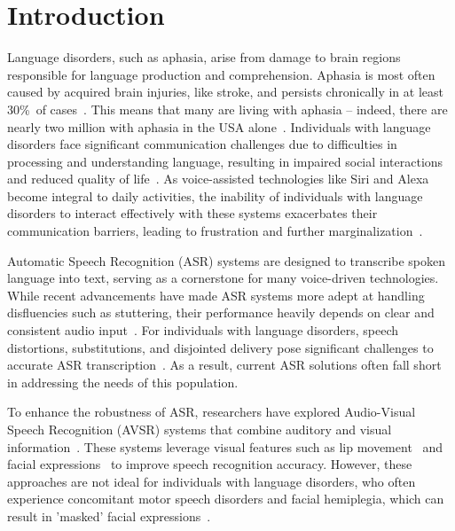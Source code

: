 \section{Introduction}

Language disorders, such as aphasia, arise from damage to brain regions responsible for language production and comprehension. Aphasia is most often caused by acquired brain injuries, like stroke, and persists chronically in at least 30\%\ of cases~\cite{broca1861remarks,wasay2014stroke}. This means that many are living with aphasia -- indeed, there are nearly two million with aphasia in the USA alone~\cite{simmons2018aphasia}. Individuals with language disorders face significant communication challenges due to difficulties in processing and understanding language, resulting in impaired social interactions and reduced quality of life~\cite{el2017screening}. As voice-assisted technologies like Siri and Alexa become integral to daily activities, the inability of individuals with language disorders to interact effectively with these systems exacerbates their communication barriers, leading to frustration and further marginalization~\cite{rohlfing2021hey}.

Automatic Speech Recognition (ASR) systems are designed to transcribe spoken language into text, serving as a cornerstone for many voice-driven technologies. While recent advancements have made ASR systems more adept at handling disfluencies such as stuttering, their performance heavily depends on clear and consistent audio input~\cite{radford2023robust}. For individuals with language disorders, speech distortions, substitutions, and disjointed delivery pose significant challenges to accurate ASR transcription~\cite{sanguedolce2023uncovering}. As a result, current ASR solutions often fall short in addressing the needs of this population.

To enhance the robustness of ASR, researchers have explored Audio-Visual Speech Recognition (AVSR) systems that combine auditory and visual information~\cite{cheng2023opensr}. These systems leverage visual features such as lip movement~\cite{hu2023hearing,cheng2023mixspeech} and facial expressions~\cite{zadeh2016multimodal,busso2008iemocap} to improve speech recognition accuracy. However, these approaches are not ideal for individuals with language disorders, who often experience concomitant motor speech disorders and facial hemiplegia, which can result in 'masked' facial expressions~\cite{multani2017emotion,duffy2012motor}.

